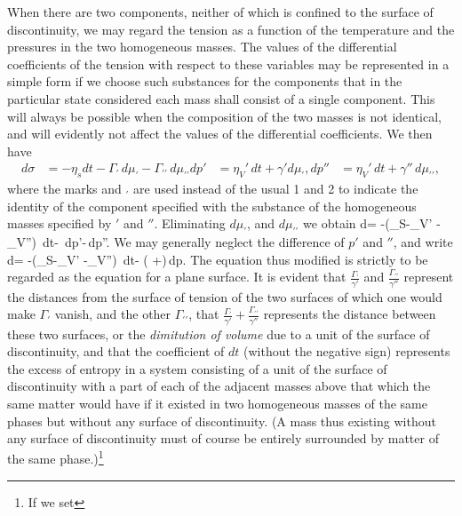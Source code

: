 \documentclass[12pt]{article}
\begin{document}
{When there are two components, neither of which is confined to the surface of discontinuity, we may regard the tension as a function of the temperature and the pressures in the two homogeneous masses. The values of the differential coefficients of the tension with respect to these variables may be represented in a simple form if we choose such substances for the components that in the particular state considered each mass shall consist of a single component. This will always be possible when the composition of the two masses is not identical, and will evidently not affect the values of the differential coefficients. We then have
\begin{align*}
d\sigma &= - \eta_s dt - \Gamma_\prime \, d\mu_\prime - \Gamma_{\prime \prime} \, d\mu_{\prime\prime}
dp'  &= \eta_V'\,dt + \gamma'd\mu_\prime,
dp'' &= \eta_V'\,dt + \gamma''\, d\mu_{\prime\prime},\end{align*}
where the marks and $_\prime$ are used instead of the usual 1 and 2 to indicate the identity of the component specified with the substance of the homogeneous masses specified by $'$ and $''$. Eliminating $d\mu_\prime$, and $d\mu_{\prime\prime}$ we obtain
\eqs d\sigma= -\left(\eta_S-\eta_V' -\eta_V''\right)\, dt- \,dp'-\,dp''. \label{579} \eqe
We may generally neglect the difference of $p'$ and $''$, and write
\eqs d\sigma= -\left(\eta_S-\eta_V' -\eta_V''\right)\, dt- \left( +\right)\,dp.  \label{580} \eqe
The equation thus modified is strictly to be regarded as the equation
for a plane surface. It is evident that $\frac{\Gamma_\prime}{\gamma'}$ and $\frac{\Gamma_{\prime\prime}}{\gamma''}$ represent the distances from the surface of tension of the two surfaces of which one would make $\Gamma_{\prime}$ vanish, and the other $\Gamma_{\prime\prime}$, that $ \frac{\Gamma_\prime}{\gamma'}+\frac{\Gamma_{\prime\prime}}{\gamma''}$ represents the distance between these two surfaces, or the \textit{dimitution of volume} due to a unit of the surface of discontinuity, and that the coefficient of $dt$ (without the negative sign) represents the excess of entropy in a system consisting of a unit of the surface of discontinuity with a part of each of the adjacent masses above that which the same matter would have if it existed in two homogeneous masses of the same phases but without any surface of discontinuity. (A mass thus existing without any surface of discontinuity must of course be entirely surrounded by matter of the same phase.)\footnote{If we set
}}
\end{document}
